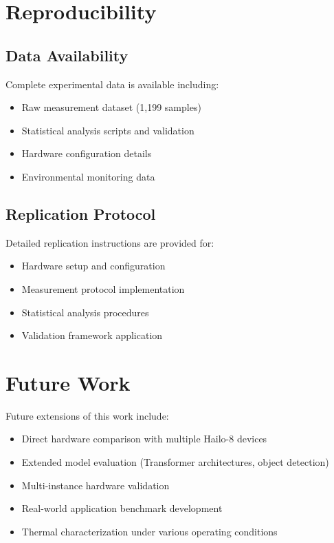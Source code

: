\documentclass[12pt,draftcls,onecolumn]{IEEEtran}
\begin{document}
\section{Reproducibility}

\subsection{Data Availability}

Complete experimental data is available including:
\begin{itemize}
    \item Raw measurement dataset (1,199 samples)
    \item Statistical analysis scripts and validation
    \item Hardware configuration details
    \item Environmental monitoring data
\end{itemize}

\subsection{Replication Protocol}

Detailed replication instructions are provided for:
\begin{itemize}
    \item Hardware setup and configuration
    \item Measurement protocol implementation
    \item Statistical analysis procedures
    \item Validation framework application
\end{itemize}

\section{Future Work}

Future extensions of this work include:
\begin{itemize}
    \item Direct hardware comparison with multiple Hailo-8 devices
    \item Extended model evaluation (Transformer architectures, object detection)
    \item Multi-instance hardware validation
    \item Real-world application benchmark development
    \item Thermal characterization under various operating conditions
\end{itemize}
\end{document}
